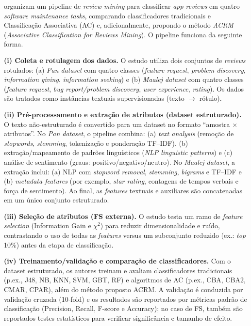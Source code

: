  organizam um pipeline de \textit{review mining} para classificar \textit{app reviews} em quatro \textit{software maintenance tasks}, comparando classificadores tradicionais e Classificação Associativa (AC) e, adicionalmente, propondo o método \textit{ACRM} (\textit{Associative Classification for Reviews Mining}). O pipeline funciona da seguinte forma.

\textbf{(i) Coleta e rotulagem dos dados.}
O estudo utiliza dois conjuntos de \textit{reviews} rotulados: (a) \textit{Pan dataset} com quatro classes (\textit{feature request}, \textit{problem discovery}, \textit{information giving}, \textit{information seeking}) e (b) \textit{Maalej dataset} com quatro classes (\textit{feature request}, \textit{bug report/problem discovery}, \textit{user experience}, \textit{rating}). Os dados são tratados como instâncias textuais supervisionadas (texto $\rightarrow$ rótulo).

\textbf{(ii) Pré-processamento e extração de atributos (dataset estruturado).}
O texto não-estruturado é convertido para um dataset no formato “amostra $\times$ atributos”.
No \textit{Pan dataset}, o pipeline combina: (a) \textit{text analysis} (remoção de \textit{stopwords}, \textit{stemming}, tokenização e ponderação TF--IDF), (b) extração/mapeamento de padrões linguísticos (\textit{NLP linguistic patterns}) e (c) análise de sentimento (graus: positivo/negativo/neutro).
No \textit{Maalej dataset}, a extração inclui: (a) NLP com \textit{stopword removal}, \textit{stemming}, \textit{bigrams} e TF--IDF e (b) \textit{metadata features} (por exemplo, \textit{star rating}, contagens de tempos verbais e força de sentimento). Ao final, as \textit{features} textuais e auxiliares são concatenadas em um único conjunto estruturado.

\textbf{(iii) Seleção de atributos (FS externa).}
O estudo testa um ramo de \textit{feature selection} (Information Gain e $\chi^2$) para reduzir dimensionalidade e ruído, contrastando o uso de todas as \textit{features} versus um subconjunto reduzido (ex.: \textit{top} 10\%) antes da etapa de classificação.

\textbf{(iv) Treinamento/validação e comparação de classificadores.}
Com o dataset estruturado, os autores treinam e avaliam classificadores tradicionais (p.ex., J48, NB, KNN, SVM, GBT, RF) e algoritmos de AC (p.ex., CBA, CBA2, CMAR, CPAR), além do método proposto ACRM. A validação é conduzida por validação cruzada (10-fold) e os resultados são reportados por métricas padrão de classificação (Precision, Recall, F-score e Accuracy); no caso de FS, também são reportados testes estatísticos para verificar significância e tamanho de efeito.

